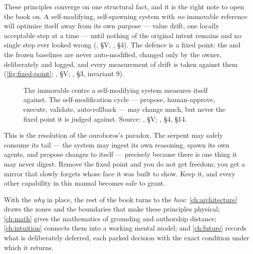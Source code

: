These principles converge on one structural fact, and it is the right note to open
the book on. A self-modifying, self-spawning system with \emph{no} immovable
reference will optimise itself away from its own purpose --- value drift, one
locally acceptable step at a time --- until nothing of the original intent remains
and no single step ever looked wrong (, \S V;
, \S 4). The defence is a fixed point: the
\Constitution{} and the frozen baselines are never auto-modified, changed only by
the owner, deliberately and logged, and every measurement of drift is taken against
them (\autoref{fig:fixed-point}; , \S V;
, \S 3, invariant 9).

\begin{figure}[t]
  \centering
  
  \caption[The fixed point]{The immovable centre a self-modifying system measures
    itself against. The self-modification cycle --- propose, human-approve, execute,
    validate, auto-rollback --- may change much, but never the fixed point it is
    judged against. Source: , \S V;
    , \S 4, \S 14.}
  \label{fig:fixed-point}
\end{figure}

This is the resolution of the ouroboros's paradox. The serpent may safely consume
its tail --- the system may ingest its own reasoning, spawn its own agents, and
propose changes to itself --- precisely because there is one thing it may never
digest. Remove the fixed point and you do not get freedom; you get a mirror that
slowly forgets whose face it was built to show. Keep it, and every other capability
in this manual becomes safe to grant.

With the \emph{why} in place, the rest of the book turns to the \emph{how}:
\autoref{ch:architecture} draws the zones and the boundaries that make these
principles physical; \autoref{ch:math} gives the mathematics of grounding and
authorship distance; \autoref{ch:intuition} connects them into a working mental
model; and \autoref{ch:future} records what is deliberately deferred, each parked
decision with the exact condition under which it returns.
